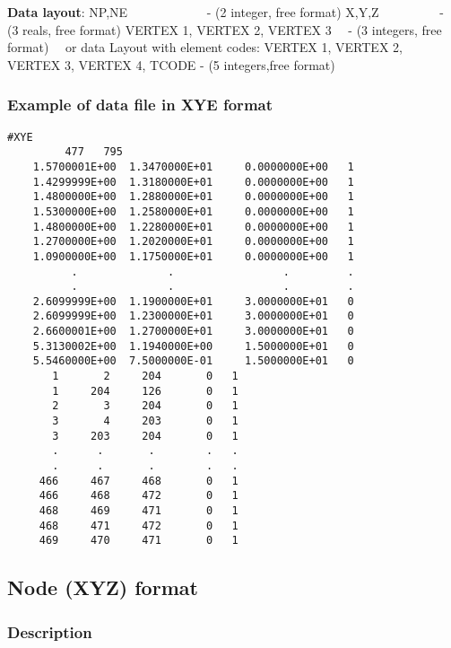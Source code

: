 \documentclass{article}
\begin{document}
\textbf{Data layout}:\newline 
NP,NE \ \ \ \ \ \ \ \ \ \ \ \ {}- (2 integer, free format)\newline
X,Y,Z \ \ \ \ \ \ \ \ \ {}- (3 reals, free format)\newline
VERTEX 1, VERTEX 2, VERTEX 3 \ \ {}- (3 integers, free format)\newline
\ \ or data Layout with element codes:\newline
VERTEX 1, VERTEX 2, VERTEX 3, VERTEX 4, TCODE - (5 integers,free format)

\subsubsection{Example of data file in XYE format}

\begin{small}
\begin{lstlisting}
#XYE
         477   795
    1.5700001E+00  1.3470000E+01     0.0000000E+00   1  
    1.4299999E+00  1.3180000E+01     0.0000000E+00   1  
    1.4800000E+00  1.2880000E+01     0.0000000E+00   1  
    1.5300000E+00  1.2580000E+01     0.0000000E+00   1  
    1.4800000E+00  1.2280000E+01     0.0000000E+00   1  
    1.2700000E+00  1.2020000E+01     0.0000000E+00   1  
    1.0900000E+00  1.1750000E+01     0.0000000E+00   1  
          .              .                 .         .
          .              .                 .         .
    2.6099999E+00  1.1900000E+01     3.0000000E+01   0  
    2.6099999E+00  1.2300000E+01     3.0000000E+01   0  
    2.6600001E+00  1.2700000E+01     3.0000000E+01   0  
    5.3130002E+00  1.1940000E+00     1.5000000E+01   0  
    5.5460000E+00  7.5000000E-01     1.5000000E+01   0  
       1       2     204       0   1
       1     204     126       0   1
       2       3     204       0   1
       3       4     203       0   1
       3     203     204       0   1
       .      .       .        .   .
       .      .       .        .   .
     466     467     468       0   1
     466     468     472       0   1
     468     469     471       0   1
     468     471     472       0   1
     469     470     471       0   1
\end{lstlisting}
\end{small}

\newpage
\subsection[Node (XYZ) format]{Node (XYZ) format}
\subsubsection[Description]{Description}
\end{document}

